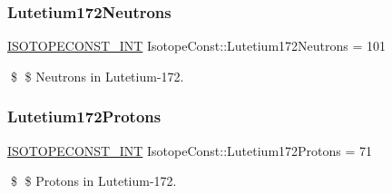 \subsubsection{\texorpdfstring{Lutetium172\+Neutrons}{Lutetium172Neutrons}}
{\footnotesize\ttfamily \mbox{\hyperlink{group___isotope_const-_macros_ga5f18360b3e99483a35c32d789e62621c}{I\+S\+O\+T\+O\+P\+E\+C\+O\+N\+S\+T\+\_\+\+I\+NT}} Isotope\+Const\+::\+Lutetium172\+Neutrons = 101}

\$ \$ Neutrons in Lutetium-\/172. \mbox{\label{group___isotope_const-_lutetium-_lu172_ga804e5ee51821f8ed73e8e2f75f21f494}} 
\subsubsection{\texorpdfstring{Lutetium172\+Protons}{Lutetium172Protons}}
{\footnotesize\ttfamily \mbox{\hyperlink{group___isotope_const-_macros_ga5f18360b3e99483a35c32d789e62621c}{I\+S\+O\+T\+O\+P\+E\+C\+O\+N\+S\+T\+\_\+\+I\+NT}} Isotope\+Const\+::\+Lutetium172\+Protons = 71}

\$ \$ Protons in Lutetium-\/172. 